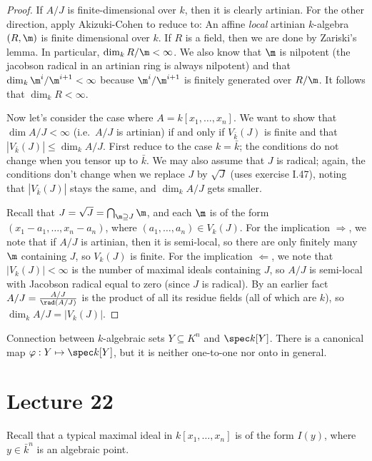  \begin{proof}
   If $A/J$ is finite-dimensional over $k$, then it is clearly artinian. For the other
   direction, apply Akizuki-Cohen \anton{} to reduce to: An affine \emph{local} artinian
   $k$-algebra $(R,\m)$ is finite dimensional over $k$. If $R$ is a field, then we are
   done by Zariski's lemma. In particular, $\dim_k R/\m < \infty$. We also know that $\m$
   is nilpotent (the jacobson radical in an artinian ring is always nilpotent) and that
   $\dim_k \m^i/\m^{i+1} <\infty$ because $\m^i/\m^{i+1}$ is finitely generated over
   $R/\m$. It follows that $\dim_k R<\infty$.

   Now let's consider the case where $A=k[x_1,\dots, x_n]$. We want to show that $\dim
   A/J< \infty$ (i.e.~$A/J$ is artinian) if and only if $V_{\bar k}(J)$ is finite and
   that $|V_{\bar k}(J)|\le \dim_k A/J$. First reduce to the case $k=\bar k$; the
   conditions do not change when you tensor up to $\bar k$. We may also assume that $J$
   is radical; again, the conditions don't change when we replace $J$ by $\sqrt J$ (uses
   exercise I.47), noting that $|V_{\bar k}(J)|$ stays the same, and $\dim_k A/J$ gets
   smaller.

   Recall that $J=\sqrt J=\bigcap_{\m\supseteq J} \m$, and each $\m$ is of the form
   $(x_1-a_1,\dots, x_n-a_n)$, where $(a_1,\dots, a_n)\in V_k(J)$. For the implication
   $\Rightarrow$, we note that if $A/J$ is artinian, then it is semi-local, so there are
   only finitely many $\m$ containing $J$, so $V_k(J)$ is finite. For the implication
   $\Leftarrow$, we note that $|V_k(J)|<\infty$ is the number of maximal ideals
   containing $J$, so $A/J$ is semi-local with Jacobson radical equal to zero (since $J$
   is radical). By an earlier fact \anton{} $A/J=\frac{A/J}{\rad (A/J)}$ is the product of
   all its residue fields (all of which are $k$), so $\dim_k A/J = |V_{k}(J)|$.
 \end{proof}

 Connection between $k$-algebraic sets $Y\subseteq K^n$ and $\spec k[Y]$. There is a
 canonical map $\varphi:Y\mapsto \spec k[Y]$, but it is neither one-to-one nor onto in
 general.
 \setcounter{lecture}{22}
 \section{Lecture 22}

 Recall that a typical maximal ideal in $k[x_1,\dots, x_n]$ is of the form $I(y)$, where
 $y\in \bar k^n$ is an algebraic point.

